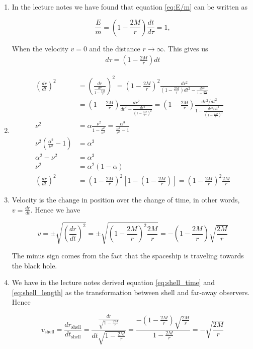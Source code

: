 \documentclass[a4paper,10pt,english]{article}
\begin{document}
\begin{enumerate}

\item In the lecture notes we have found that equation \ref{eq:E/m} can be written as 

\[\frac{E}{m}=\left(1-\frac{2M}{r}\right)\frac{dt}{d\tau}=1,\]

When the velocity $v=0$ and the distance $r\to\infty$. This gives us
\begin{align*}
d\tau=\left(1-\frac{2M}{r}\right)dt
\end{align*}

\item

\begin{align*}
\left(\frac{dr}{dt}\right)^{2}&=\left(\frac{dr}{\frac{d\tau}{1-\frac{2M}{r}}}\right)^{2}=\left(1-\frac{2M}{r}\right)^{2}\frac{dr^{2}}{\left(1-\frac{2M}{r}\right)dt^{2}-\frac{dr^{2}}{1-\frac{2M}{r}}}\\
&=\left(1-\frac{2M}{r}\right)\frac{dr^{2}}{dt^{2}-\frac{dr^{2}}{\left(1-\frac{2M}{r}\right)^{2}}}=\left(1-\frac{2M}{r}\right)\frac{dr^{2}/dt^{2}}{1-\frac{dr^{2}/dt^{2}}{\left(1-\frac{2M}{r}\right)^{2}}}\\
\nu^{2}&=\alpha\frac{\nu^{2}}{1-\frac{\nu^{2}}{\alpha^{2}}}=\frac{\alpha^{3}}{\frac{\alpha^{2}}{\nu^{2}}-1}\\
\nu^{2}\left(\frac{\alpha^{2}}{\nu^{2}}-1\right)&=\alpha^{3}\\
\alpha^{2}-\nu^{2}&=\alpha^{3}\\
\nu^{2}&=\alpha^{2}(1-\alpha)\\
\left(\frac{dr}{dt}\right)^{2}&=\left(1-\frac{2M}{r}\right)^{2}\left[1-\left(1-\frac{2M}{r}\right)\right]=\left(1-\frac{2M}{r}\right)^{2}\frac{2M}{r}
\end{align*}

\item Velocity is the change in position over the change of time, in other words, $v=\frac{dr}{dt}$. Hence we have 

\begin{equation*}
v=\pm\sqrt{\left(\frac{dr}{dt}\right)^{2}}=\pm\sqrt{\left(1-\frac{2M}{r}\right)^{2}\frac{2M}{r}}=-\left(1-\frac{2M}{r}\right)\sqrt{\frac{2M}{r}}
\end{equation*}

The minus sign comes from the fact that the spaceship is traveling towards the black hole.

\item We have in the lecture notes derived equation \ref{eq:shell_time} and \ref{eq:shell_length} as the transformation between shell and far-away observers. Hence

\begin{equation}
v_{\text{shell}}=\frac{dr_{\text{shell}}}{dt_{\text{shell}}}=\frac{\frac{dr}{\sqrt{1-\frac{2M}{r}}}}{dt\sqrt{1-\frac{2M}{r}}}=\frac{-\left(1-\frac{2M}{r}\right)\sqrt{\frac{2M}{r}}}{1-\frac{2M}{r}}=-\sqrt{\frac{2M}{r}}
\end{equation}


\end{enumerate}
\end{document}
